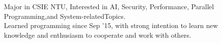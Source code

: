 

\begin{cvparagraph}

Major  in  CSIE  NTU,  Interested  in  AI,  Security,  Performance,  Parallel  Programming,and  System-relatedTopics.
\\ Learned programming since Sep '15, with strong intention to learn new knowledge and enthusiasm to cooperate and work with others.
\end{cvparagraph}
